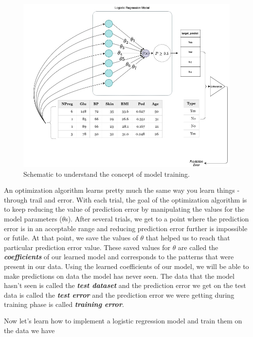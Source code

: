 \documentclass[
  letterpaper,
]{book}
\begin{document}
\begin{figure}

{\centering \includegraphics{./images/logisticregression.jpg}

}

\caption{Schematic to understand the concept of model training.}

\end{figure}

An optimization algorithm learns pretty much the same way you learn
things - through trail and error. With each trial, the goal of the
optimization algorithm is to keep reducing the value of prediction error
by manipulating the values for the model parameters (\(\theta\)s). After
several trials, we get to a point where the prediction error is in an
acceptable range and reducing prediction error further is impossible or
futile. At that point, we save the values of \(\theta\) that helped us
to reach that particular prediction error value. These saved values for
\(\theta\) are called the \textbf{\emph{coefficients}} of our learned
model and corresponds to the patterns that were present in our data.
Using the learned coefficients of our model, we will be able to make
predictions on data the model has never seen. The data that the model
hasn't seen is called the \textbf{\emph{test dataset}} and the
prediction error we get on the test data is called the
\textbf{\emph{test error}} and the prediction error we were getting
during training phase is called \textbf{\emph{training error}}.

Now let's learn how to implement a logistic regression model and train
them on the data we have
\end{document}
